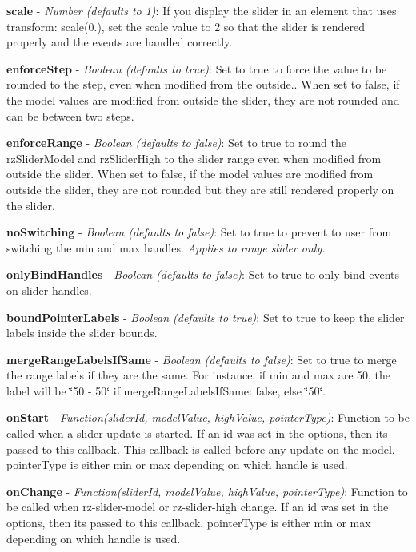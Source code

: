 {\bfseries scale} -\/ {\itshape Number (defaults to 1)}\+: If you display the slider in an element that uses {\ttfamily transform\+: scale(0.)}, set the {\ttfamily scale} value to 2 so that the slider is rendered properly and the events are handled correctly.

{\bfseries enforce\+Step} -\/ {\itshape Boolean (defaults to true)}\+: Set to true to force the value to be rounded to the step, even when modified from the outside.. When set to false, if the model values are modified from outside the slider, they are not rounded and can be between two steps.

{\bfseries enforce\+Range} -\/ {\itshape Boolean (defaults to false)}\+: Set to true to round the {\ttfamily rz\+Slider\+Model} and {\ttfamily rz\+Slider\+High} to the slider range even when modified from outside the slider. When set to false, if the model values are modified from outside the slider, they are not rounded but they are still rendered properly on the slider.

{\bfseries no\+Switching} -\/ {\itshape Boolean (defaults to false)}\+: Set to true to prevent to user from switching the min and max handles. {\itshape Applies to range slider only.}

{\bfseries only\+Bind\+Handles} -\/ {\itshape Boolean (defaults to false)}\+: Set to true to only bind events on slider handles.

{\bfseries bound\+Pointer\+Labels} -\/ {\itshape Boolean (defaults to true)}\+: Set to true to keep the slider labels inside the slider bounds.

{\bfseries merge\+Range\+Labels\+If\+Same} -\/ {\itshape Boolean (defaults to false)}\+: Set to true to merge the range labels if they are the same. For instance, if min and max are 50, the label will be \char`\"{}50 -\/ 50\char`\"{} if {\ttfamily merge\+Range\+Labels\+If\+Same\+: false}, else \char`\"{}50\char`\"{}.

{\bfseries on\+Start} -\/ {\itshape Function(slider\+Id, model\+Value, high\+Value, pointer\+Type)}\+: Function to be called when a slider update is started. If an id was set in the options, then it\textquotesingle{}s passed to this callback. This callback is called before any update on the model. {\ttfamily pointer\+Type} is either \textquotesingle{}min\textquotesingle{} or \textquotesingle{}max\textquotesingle{} depending on which handle is used.

{\bfseries on\+Change} -\/ {\itshape Function(slider\+Id, model\+Value, high\+Value, pointer\+Type)}\+: Function to be called when rz-\/slider-\/model or rz-\/slider-\/high change. If an id was set in the options, then it\textquotesingle{}s passed to this callback. {\ttfamily pointer\+Type} is either \textquotesingle{}min\textquotesingle{} or \textquotesingle{}max\textquotesingle{} depending on which handle is used.

